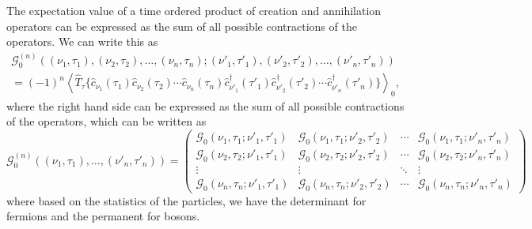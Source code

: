 \begin{theorem}
    The expectation value of a time ordered product of creation and annihilation operators can be expressed as the sum of all possible contractions of the operators. We can write this as
    \[
        \begin{aligned}
            \mathcal{G}^{(n)}_0 ((\nu_1, \tau_1), (\nu_2, \tau_2), \ldots, (\nu_n, \tau_n); (\nu'_1, \tau'_1), (\nu'_2, \tau'_2), \ldots, (\nu'_n, \tau'_n)) \\
            = (-1)^n \left\langle \hat{T}_{\tau} \{\hat{c}_{\nu_1}(\tau_1) \hat{c}_{\nu_2}(\tau_2) \cdots \hat{c}_{\nu_n}(\tau_n) \hat{c}^{\dagger}_{\nu'_1}(\tau'_1) \hat{c}^{\dagger}_{\nu'_2}(\tau'_2) \cdots \hat{c}^{\dagger}_{\nu'_n}(\tau'_n)\} \right\rangle_0,
        \end{aligned}
    \]
    where the right hand side can be expressed as the sum of all possible contractions of the operators, which can be written as
    \[
        \mathcal{G}^{(n)}_0 ((\nu_1, \tau_1), \ldots, (\nu'_n, \tau'_n)) = \begin{pmatrix}
            \mathcal{G}_0(\nu_1, \tau_1; \nu'_1, \tau'_1) & \mathcal{G}_0(\nu_1, \tau_1; \nu'_2, \tau'_2) & \cdots & \mathcal{G}_0(\nu_1, \tau_1; \nu'_n, \tau'_n) \\
            \mathcal{G}_0(\nu_2, \tau_2; \nu'_1, \tau'_1) & \mathcal{G}_0(\nu_2, \tau_2; \nu'_2, \tau'_2) & \cdots & \mathcal{G}_0(\nu_2, \tau_2; \nu'_n, \tau'_n) \\
            \vdots                                        & \vdots                                        & \ddots & \vdots                                        \\
            \mathcal{G}_0(\nu_n, \tau_n; \nu'_1, \tau'_1) & \mathcal{G}_0(\nu_n, \tau_n; \nu'_2, \tau'_2) & \cdots & \mathcal{G}_0(\nu_n, \tau_n; \nu'_n, \tau'_n)
        \end{pmatrix}
    \]
    where based on the statistics of the particles, we have the determinant for fermions and the permanent for bosons.
\end{theorem}

